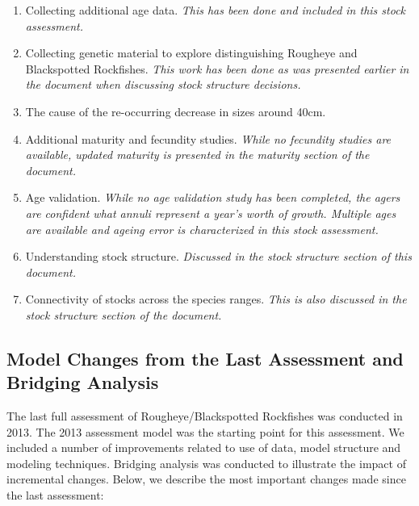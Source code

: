 \documentclass[
]{scrartcl}
\providecommand{\tightlist}{%
  \setlength{\itemsep}{0pt}\setlength{\parskip}{0pt}}\usepackage{longtable,booktabs,array}
\begin{document}
\begin{enumerate}
\def\labelenumi{\arabic{enumi}.}
\tightlist
\item
  Collecting additional age data. \emph{This has been done and included
  in this stock assessment.}
\item
  Collecting genetic material to explore distinguishing Rougheye and
  Blackspotted Rockfishes. \emph{This work has been done as was
  presented earlier in the document when discussing stock structure
  decisions.}
\item
  The cause of the re-occurring decrease in sizes around 40cm.
\item
  Additional maturity and fecundity studies. \emph{While no fecundity
  studies are available, updated maturity is presented in the maturity
  section of the document.}
\item
  Age validation. \emph{While no age validation study has been
  completed, the agers are confident what annuli represent a year's
  worth of growth. Multiple ages are available and ageing error is
  characterized in this stock assessment.}
\item
  Understanding stock structure. \emph{Discussed in the stock structure
  section of this document.}
\item
  Connectivity of stocks across the species ranges. \emph{This is also
  discussed in the stock structure section of the document.}
\end{enumerate}

\subsection{Model Changes from the Last Assessment and Bridging
Analysis}\label{sec-bridging}

The last full assessment of Rougheye/Blackspotted Rockfishes was
conducted in 2013. The 2013 assessment model was the starting point for
this assessment. We included a number of improvements related to use of
data, model structure and modeling techniques. Bridging analysis was
conducted to illustrate the impact of incremental changes. Below, we
describe the most important changes made since the last assessment:
\end{document}
